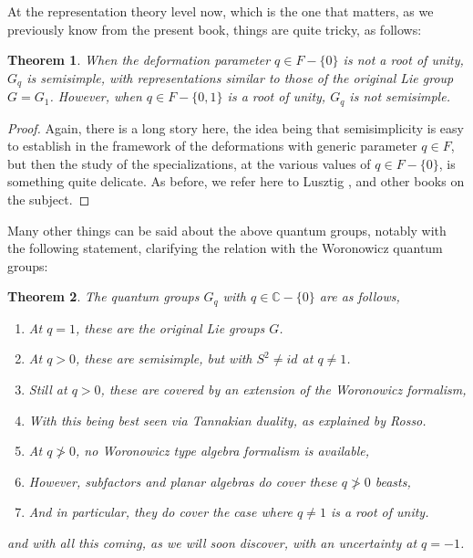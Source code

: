 \documentclass[12pt]{amsbook}
\newtheorem{theorem}{Theorem}[chapter]
\begin{document}
At the representation theory level now, which is the one that matters, as we previously know from the present book, things are quite tricky, as follows:


\begin{theorem}
When the deformation parameter $q\in F-\{0\}$ is not a root of unity, $G_q$ is semisimple, with representations similar to those of the original Lie group $G=G_1$. However, when $q\in F-\{0,1\}$ is a root of unity, $G_q$ is not semisimple.
\end{theorem}

\begin{proof}
Again, there is a long story here, the idea being that semisimplicity is easy to establish in the framework of the deformations with generic parameter $q\in F$, but then the study of the specializations, at the various values of $q\in F-\{0\}$, is something quite delicate. As before, we refer here to Lusztig \cite{lus}, and other books on the subject.
\end{proof}

Many other things can be said about the above quantum groups, notably with the following statement, clarifying the relation with the Woronowicz quantum groups:


\begin{theorem}
The quantum groups $G_q$ with $q\in\mathbb C-\{0\}$ are as follows,
\begin{enumerate}
\item At $q=1$, these are the original Lie groups $G$.

\item At $q>0$, these are semisimple, but with $S^2\neq id$ at $q\neq1$.

\item Still at $q>0$, these are covered by an extension of the Woronowicz formalism,

\item With this being best seen via Tannakian duality, as explained by Rosso.

\item At $q\not>0$, no Woronowicz type algebra formalism is available,

\item However, subfactors and planar algebras do cover these $q\not>0$ beasts,

\item And in particular, they do cover the case where $q\neq 1$ is a root of unity.
\end{enumerate}
and with all this coming, as we will soon discover, with an uncertainty at $q=-1$.
\end{theorem}
\end{document}
